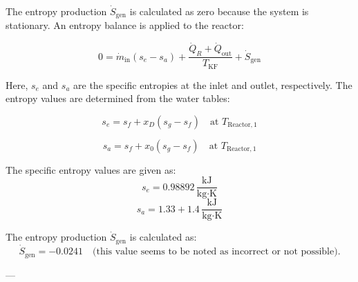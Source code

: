 The entropy production \( \dot{S}_{\text{gen}} \) is calculated as zero because the system is stationary. An entropy balance is applied to the reactor:  

\[
0 = \dot{m}_{\text{in}} (s_e - s_a) + \frac{\dot{Q}_R + \dot{Q}_{\text{out}}}{T_{\text{KF}}} + \dot{S}_{\text{gen}}
\]

Here, \( s_e \) and \( s_a \) are the specific entropies at the inlet and outlet, respectively. The entropy values are determined from the water tables:  

\[
s_e = s_f + x_D (s_g - s_f) \quad \text{at } T_{\text{Reactor},1}
\]

\[
s_a = s_f + x_0 (s_g - s_f) \quad \text{at } T_{\text{Reactor},1}
\]

The specific entropy values are given as:  
\[
s_e = 0.98892 \, \frac{\text{kJ}}{\text{kg·K}}
\]
\[
s_a = 1.33 + 1.4 \, \frac{\text{kJ}}{\text{kg·K}}
\]

The entropy production \( \dot{S}_{\text{gen}} \) is calculated as:  
\[
\dot{S}_{\text{gen}} = -0.0241 \quad \text{(this value seems to be noted as incorrect or not possible).}
\]

---